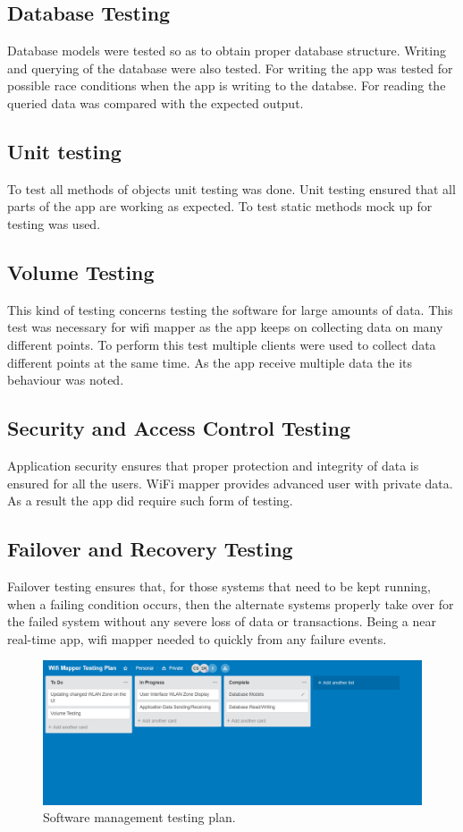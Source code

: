 \subsection*{Database Testing}
Database models were tested so as to obtain proper database structure. Writing and querying of the database were also tested. For writing the app was tested for possible race conditions when the app is writing to the databse. For reading the queried data was compared with the expected output.

\subsection*{Unit testing}
To test all methods of objects unit testing was done. Unit testing ensured that all parts of the app are working as expected. To test static methods mock up for testing was used.

\subsection*{Volume Testing}
This kind of testing concerns testing the software for large amounts of data. This test was necessary for wifi mapper as the app keeps on collecting data on many different points. To perform this test multiple clients were used to collect data different points at the same time. As the app receive multiple data the its behaviour was noted.

\subsection*{Security and Access Control Testing}
Application security ensures that proper protection and integrity of data is ensured for all the users. WiFi mapper provides advanced user with private data. As a result the app did require such form of testing.

\subsection*{Failover and Recovery Testing}
Failover testing ensures that, for those systems that need to be kept running, when a failing condition occurs, then the alternate systems properly take over for the failed system without any severe loss of data or transactions. Being a near real-time app, wifi mapper needed to quickly from any failure events.

\begin{figure}
	\centering
	\includegraphics[width=0.7\linewidth]{images/testing_plan}
	\caption{Software management testing plan.}
	\label{fig:testingplan}
\end{figure}
\newpage

